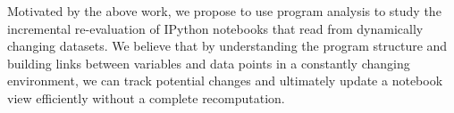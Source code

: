 \documentclass[11pt,letterpaper]{article}
\begin{document}
Motivated by the above work, we propose to use program analysis to study the incremental re-evaluation of IPython notebooks that read from dynamically changing datasets. We believe that by understanding the program structure and building links between variables and data points in a constantly changing environment,  we can track potential changes and ultimately update a notebook view efficiently without a complete recomputation. 



\end{document}
